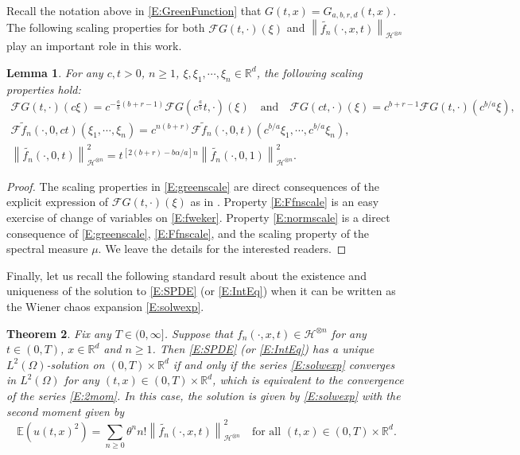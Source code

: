 \documentclass[12pt]{report}
\theoremstyle{plain}
\newtheorem{theorem}{Theorem}[section]
\newtheorem{lemma}[theorem]{Lemma}
\theoremstyle{definition}
\numberwithin{equation}{section}
\newcommand{\R}{\mathbb{R}}
\newcommand{\Norm}[1]{\left\|  #1   \right\|}
\begin{document}
Recall the notation above in \eqref{E:GreenFunction} that $G(t,x) = G_{a,b,r,d}(t,x)$. The following
scaling properties for both $\mathcal{F}G(t,\cdot)(\xi)$ and
$\Norm{\widetilde{f_n}(\cdot,x,t)}_{\mathcal{H}^{\otimes n}}$ play an important role in this work.

\begin{lemma} \label{L:Scale}
	For any $c,t>0$, $n\ge 1$, $\xi,\xi_1,\cdots,\xi_n\in\R^d$, the following scaling properties hold:
	\begin{gather} \label{E:greenscale}
	\mathcal{F}G(t,\cdot)(c\xi) = c^{-\frac{a}{b}(b+r
		-1)}\mathcal{F}G\left(c^{\frac{a}{b}}t,\cdot\right)( \xi) \quad \text{and} \quad
	\mathcal{F}G(ct,\cdot)(\xi) = c^{b+r -1}\mathcal{F}G(t,\cdot)(c^{b/a} \xi), \\
	\label{E:Ffnscale} \mathcal{F}\widetilde{f}_n(\cdot,0,ct)(\xi_1,\cdots,\xi_n) = c^{n(b+r)}
	\mathcal{F}\widetilde{f}_n(\cdot,0,t)(c^{b/a}\xi_1, \cdots, c^{b/a}\xi_n), \\
	\label{E:normscale} \Norm{\widetilde{f_n}(\cdot,0,t)}_{\mathcal{H}^{\otimes n}}^2 = t^{[2(b + r
		) -b \alpha / a]n} \Norm{\widetilde{f_n}(\cdot,0,1)}_{\mathcal{H}^{\otimes n}}^2.
	\end{gather}
\end{lemma}
\begin{proof}
	The scaling properties in \eqref{E:greenscale} are direct consequences of the explicit expression
	of $\mathcal{F}G(t,\cdot)(\xi)$ as in \cite[(4.8)]{chen.hu.ea:19:nonlinear}. Property \eqref{E:Ffnscale} is an easy
	exercise of change of variables on \eqref{E:fweker}. Property \eqref{E:normscale} is a direct
	consequence of \eqref{E:greenscale}, \eqref{E:Ffnscale}, and the scaling property of the spectral
	measure $\mu$. We leave the details for the interested readers.
\end{proof}

Finally, let us recall the following standard result about the existence and uniqueness of the
solution to \eqref{E:SPDE} (or \eqref{E:IntEq}) when it can be written as the Wiener chaos expansion
\eqref{E:solwexp}.

\begin{theorem}\label{T:2momseries}
	Fix any $T \in (0,\infty]$. Suppose that $f_n(\cdot,x,t) \in \mathcal{H}^{\otimes n}$ for any $t
	\in (0,T)$, $x \in \R^d$ and $n \ge 1$. Then \eqref{E:SPDE} (or \eqref{E:IntEq}) has a unique
	$L^2(\Omega)$-solution on $(0,T) \times \R^d$ if and only if the series \eqref{E:solwexp}
	converges in $L^2(\Omega)$ for any $(t,x) \in (0,T) \times \R^d$, which is equivalent to the
	convergence of the series \eqref{E:2mom}. In this case, the solution is given by \eqref{E:solwexp}
	with the second moment given by
	\begin{equation} \label{E:2mom}
	\mathbb{E}\left(u(t,x)^2\right)
	= \sum_{n \ge 0} \theta^n n!  \Norm{\widetilde{f_n}(\cdot,x,t)}_{\mathcal{H}^{\otimes n}}^2
	\quad \text{for all $(t,x) \in (0,T) \times \R^d$}.
	\end{equation}
\end{theorem}
\end{document}
